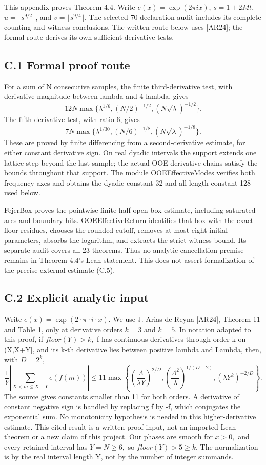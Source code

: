 \documentclass[11pt,a4paper]{article}
\begin{document}
This appendix proves Theorem 4.4. Write \(e(x)=\exp(2\pi i x)\),
\(s=1+2Mt\), \(u=\lfloor s^{9/2}\rfloor\), and
\(v=\lfloor s^{9/4}\rfloor\). The selected 70-declaration audit includes
its complete counting and witness conclusions. The written route below
uses {[}AR24{]}; the formal route derives its own sufficient derivative
tests.

\subsection{C.1 Formal proof route}\label{c.1-formal-proof-route}

For a sum of N consecutive samples, the finite third-derivative test,
with derivative magnitude between lambda and 4 lambda, gives \[
12N\max\{\lambda^{1/6},(N/2)^{-1/2},(N\sqrt\lambda)^{-1/2}\}.
\] The fifth-derivative test, with ratio 6, gives \[
7N\max\{\lambda^{1/30},(N/6)^{-1/8},(N\sqrt\lambda)^{-1/8}\}.
\] These are proved by finite differencing from a second-derivative
estimate, for either constant derivative sign. On real dyadic intervals
the support extends one lattice step beyond the last sample; the actual
OOE derivative chains satisfy the bounds throughout that support. The
module OOEEffectiveModes verifies both frequency axes and obtains the
dyadic constant 32 and all-length constant 128 used below.

FejerBox proves the pointwise finite half-open box estimate, including
saturated arcs and boundary hits. OOEEffectiveReturn identifies that box
with the exact floor residues, chooses the rounded cutoff, removes at
most eight initial parameters, absorbs the logarithm, and extracts the
strict witness bound. Its separate audit covers all 23 theorems. Thus no
analytic cancellation premise remains in Theorem 4.4's Lean statement.
This does not assert formalization of the precise external estimate
(C.5).

\subsection{C.2 Explicit analytic
input}\label{c.2-explicit-analytic-input}

Write \(e(x)=\exp(2\cdot \pi\cdot i\cdot x).\) We use J. Arias de Reyna
{[}AR24{]}, Theorem 11 and Table 1, only at derivative orders \(k=3\)
and \(k=5.\) In notation adapted to this proof, if \(floor(Y)>k,\) f has
continuous derivatives through order k on (X,X+Y{]}, and its k-th
derivative lies between positive lambda and Lambda, then, with
\(D=2^k,\) \[
\frac1Y\left|\sum_{X<m\le X+Y}e(f(m))\right|
\le 11\max\left\{
 \left(\frac{\Lambda}{\lambda Y}\right)^{2/D},
 \left(\frac{\Lambda^2}{\lambda}\right)^{1/(D-2)},
 (\lambda Y^k)^{-2/D}\right\}. \tag{C.5}
\] The source gives constants smaller than 11 for both orders. A
derivative of constant negative sign is handled by replacing f by -f,
which conjugates the exponential sum. No monotonicity hypothesis is
needed in this higher-derivative estimate. This cited result is a
written proof input, not an imported Lean theorem or a new claim of this
project. Our phases are smooth for \(x>0,\) and every retained interval
has \(Y=N\ge 6,\) so \(floor(Y)>5\ge k.\) The normalization is by the
real interval length Y, not by the number of integer summands.
\end{document}
